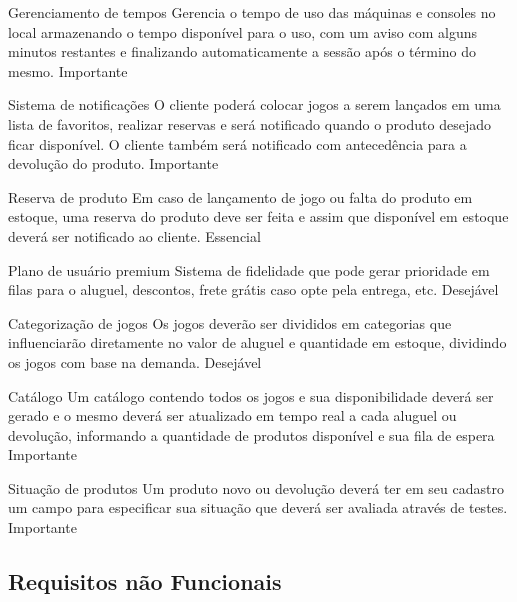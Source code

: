 \documentclass{article}
\begin{document}
    \begin{functional}
      \requirement
      {Gerenciamento de tempos}
      {Gerencia o tempo de uso das máquinas e consoles no local armazenando o tempo disponível para o uso, com um aviso com alguns minutos restantes e finalizando automaticamente a sessão após o término do mesmo.}
      {Importante}
      
    \requirement
      {Sistema de notificações}
      {O cliente poderá colocar jogos a serem lançados em uma lista de favoritos, realizar reservas e será notificado quando o produto desejado ficar disponível. O cliente também será notificado com antecedência para a devolução do produto.}
      {Importante}

     \requirement
      {Reserva de produto}
      {Em caso de lançamento de jogo ou falta do produto em estoque, uma reserva do produto deve ser feita e assim que disponível em estoque deverá ser notificado ao cliente.}
      {Essencial}
      
   
      \requirement
      {Plano de usuário premium}
      {Sistema de fidelidade que pode gerar prioridade em filas para o aluguel, descontos, frete grátis caso opte pela entrega, etc.}
      {Desejável}

      \requirement
      {Categorização de jogos}
      {Os jogos deverão ser divididos em categorias que influenciarão diretamente no valor de aluguel e quantidade em estoque, dividindo os jogos com base na demanda.}
      {Desejável}
      
      \requirement
      {Catálogo}
      {Um catálogo contendo todos os jogos e sua disponibilidade deverá ser gerado e o mesmo deverá ser atualizado em tempo real a cada aluguel ou devolução, informando a quantidade de produtos disponível e sua fila de espera}
      {Importante}
      
      \requirement
      {Situação de produtos}
      {Um produto novo ou devolução deverá ter em seu cadastro um campo para especificar sua situação que deverá ser avaliada através de testes.}
      {Importante}

    \end{functional} 
 
\subsection{Requisitos não Funcionais}
\end{document}

